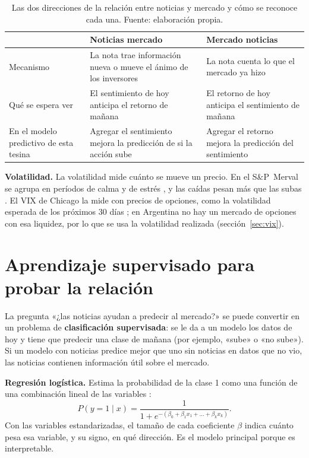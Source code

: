 \begin{table}[H]
\centering\small
\begin{tabularx}{\linewidth}{@{}L{3.2cm}YY@{}}
\toprule
 & \textbf{Noticias \flecha{} mercado} & \textbf{Mercado \flecha{} noticias} \\
\midrule
Mecanismo & La nota trae información nueva o mueve el ánimo de los inversores & La nota cuenta lo que el mercado ya hizo \\
Qué se espera ver & El sentimiento de hoy anticipa el retorno de mañana & El retorno de hoy anticipa el sentimiento de mañana \\
En el modelo predictivo de esta tesina & Agregar el sentimiento mejora la predicción de si la acción sube & Agregar el retorno mejora la predicción del sentimiento \\
\bottomrule
\end{tabularx}
\caption{Las dos direcciones de la relación entre noticias y mercado y cómo se reconoce cada
una. Fuente: elaboración propia.}
\label{tab:mecanismos}
\end{table}

\textbf{Volatilidad.} La volatilidad mide cuánto se mueve un precio. En el S\&P~Merval se agrupa
en períodos de calma y de estrés \citep{segovia2022}, y las caídas pesan más que las subas
\citep{otuki2008}. El VIX de Chicago la mide con precios de opciones, como la volatilidad esperada
de los próximos 30 días \citep{cboe_vix}; en Argentina no hay un mercado de opciones con esa
liquidez, por lo que se usa la volatilidad realizada (sección~\ref{sec:vix}).

\section{Aprendizaje supervisado para probar la relación}
\label{sec:ml}

La pregunta «¿las noticias ayudan a predecir al mercado?» se puede convertir en un problema de
\textbf{clasificación supervisada}: se le da a un modelo los datos de hoy y tiene que predecir una
clase de mañana (por ejemplo, «sube» o «no sube»). Si un modelo con noticias predice mejor que uno
sin noticias en datos que no vio, las noticias contienen información útil sobre el mercado.

\textbf{Regresión logística.} Estima la probabilidad de la clase 1 como una función de una
combinación lineal de las variables \citep{hosmer2013}:
\begin{equation}
P(y = 1 \mid x) = \frac{1}{1 + e^{-(\beta_0 + \beta_1 x_1 + \dots + \beta_k x_k)}}.
\end{equation}
Con las variables estandarizadas, el tamaño de cada coeficiente $\beta$ indica cuánto pesa esa
variable, y su signo, en qué dirección. Es el modelo principal porque es interpretable.

